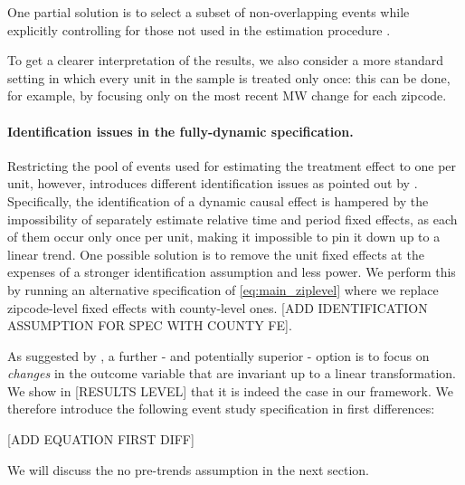 One partial solution is to select a subset of non-overlapping events while explicitly controlling for those not used in the estimation procedure \parencite{dube2016minimum}. 

To get a clearer interpretation of the results, we also consider a more standard setting in which every unit in the sample is treated only once: this can be done, for example, by focusing only on the most recent MW change for each zipcode.   


\paragraph{Identification issues in the fully-dynamic specification.} Restricting the pool of events used for estimating the treatment effect to one per unit, however, introduces different identification issues as pointed out by \textcite{borusyak2017revisiting}. Specifically, the identification of a dynamic causal effect is hampered by the impossibility of separately estimate relative time and period fixed effects, as each of them occur only once per unit, making it impossible to pin it down up to a linear trend. One possible solution is to remove the unit fixed effects at the expenses of a stronger identification assumption and less power. We perform this by running an alternative specification of \autoref{eq:main_ziplevel} where we replace zipcode-level fixed effects with county-level ones. [ADD IDENTIFICATION ASSUMPTION FOR SPEC WITH COUNTY FE]. 

As suggested by \textcite{borusyak2017revisiting}, a further - and potentially superior - option is to focus on \textit{changes} in the outcome variable that are invariant up to a linear transformation. We show in [RESULTS LEVEL] that it is indeed the case in our framework. We therefore introduce the following event study specification in first differences:

[ADD EQUATION FIRST DIFF]



We will discuss the no pre-trends assumption in the next section.
